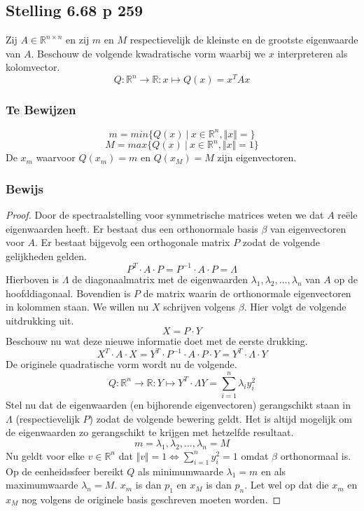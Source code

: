 \documentclass[lineaire_algebra_oplossingen.tex]{subfiles}
\begin{document}
\subsection{Stelling 6.68 p 259}
Zij $A \in \mathbb{R}^{n\times n}$ en zij $m$ en $M$ respectievelijk de kleinste en de grootste eigenwaarde van $A$.
Beschouw de volgende kwadratische vorm  waarbij we $x$ interpreteren als kolomvector.
\[
Q:\mathbb{R}^n \rightarrow \mathbb{R}:x \mapsto Q(x) = x^TAx
\]

\subsubsection*{Te Bewijzen}
\[
m = min\{ Q(x)\ |\ x \in \mathbb{R}^n, \Vert x\Vert = \}
\]
\[
M = max\{ Q(x)\ |\ x \in \mathbb{R}^n, \Vert x\Vert = 1\}
\]
De $x_m$ waarvoor $Q(x_m)=m$ en $Q(x_M)=M$ zijn eigenvectoren. 

\subsubsection*{Bewijs}
\begin{proof}
Door de spectraalstelling voor symmetrische matrices weten we dat $A$ re\"ele eigenwaarden heeft.
Er bestaat dus een orthonormale basis $\beta$ van eigenvectoren voor $A$.
Er bestaat bijgevolg een orthogonale matrix $P$ zodat de volgende gelijkheden gelden.
\[
P^T\cdot A\cdot P = P^{-1}\cdot A\cdot P = \Lambda
\]
Hierboven is $\Lambda$ de diagonaalmatrix met de eigenwaarden $\lambda_1,\lambda_2,...,\lambda_n$ van $A$ op de hoofddiagonaal.
Bovendien is $P$ de matrix waarin de orthonormale eigenvectoren in kolommen staan.
We willen nu $X$ schrijven volgens $\beta$. Hier volgt de volgende uitdrukking uit.
\[
X = P\cdot Y
\]
Beschouw nu wat deze nieuwe informatie doet met de eerste drukking.
\[
X^T\cdot A \cdot X = Y^T\cdot P^{-1}\cdot A\cdot P\cdot Y  = Y^T\cdot \Lambda \cdot Y
\]
De originele quadratische vorm wordt nu de volgende.
\[
Q:\mathbb{R}^n \rightarrow \mathbb{R}: Y \mapsto Y^T\cdot \Lambda Y = \sum_{i=1}^n\lambda_iy_i^2
\]
Stel nu dat de eigenwaarden (en bijhorende eigenvectoren) gerangschikt staan in $\Lambda$ (respectievelijk $P$) zodat de volgende bewering geldt. 
Het is altijd mogelijk om de eigenwaarden zo gerangschikt te krijgen met hetzelfde resultaat.
\[
m=\lambda_1,\lambda_2,...,\lambda_n=M
\]
Nu geldt voor elke $v\in \mathbb{R}^n$ dat $\Vert v\Vert = 1 \Leftrightarrow \sum_{i=1}^ny_i^2 = 1$ omdat $\beta$ orthonormaal is.
Op de eenheidssfeer bereikt $Q$ als minimumwaarde $\lambda_1=m$ en als maximumwaarde $\lambda_n=M$. $x_m$ is dan $p_1$ en $x_M$ is dan $p_n$. Let wel op dat die $x_m$ en $x_M$ nog volgens de originele basis geschreven moeten worden.
\end{proof}
\end{document}
